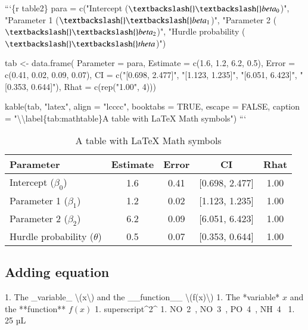 \documentclass[review]{elsarticle} %
\newenvironment{Shaded}{\begin{snugshade}}{\end{snugshade}}
\newcommand{\BaseNTok}[1]{\textcolor[rgb]{0.00,0.00,0.81}{#1}}
\newcommand{\FloatTok}[1]{\textcolor[rgb]{0.00,0.00,0.81}{#1}}
\newcommand{\NormalTok}[1]{#1}
\begin{document}
\begin{Shaded}
\begin{Highlighting}[]
\NormalTok{```\{r table2\}}
\NormalTok{para = c("Intercept ($\textbackslash{}\textbackslash{}beta_0$)",}
\BaseNTok{         "Parameter 1 ($\textbackslash{}\textbackslash{}beta_1$)",}
\BaseNTok{         "Parameter 2 ($\textbackslash{}\textbackslash{}beta_2$)",}
\BaseNTok{         "Hurdle probability ($\textbackslash{}\textbackslash{}theta$)")}

\NormalTok{tab <- data.frame(}
\BaseNTok{    Parameter = para,}
\BaseNTok{    Estimate = c(1.6, 1.2, 6.2, 0.5),}
\BaseNTok{    Error = c(0.41, 0.02, 0.09, 0.07),}
\BaseNTok{    CI = c("[0.698, 2.477]",}
\BaseNTok{           "[1.123, 1.235]",}
\BaseNTok{           "[6.051, 6.423]",}
\BaseNTok{           "[0.353, 0.644]"),}
\BaseNTok{    Rhat = c(rep("1.00", 4)))}

\NormalTok{kable(tab,}
\BaseNTok{      "latex",}
\BaseNTok{      align = "lcccc",}
\BaseNTok{      booktabs = TRUE,}
\BaseNTok{      escape = FALSE,}
\BaseNTok{      caption = "\textbackslash{}\textbackslash{}label\{tab:mathtable\}A table with LaTeX Math symbols")}
\NormalTok{```}
\end{Highlighting}
\end{Shaded}

\begin{table}

\caption{\label{tab:unnamed-chunk-3}\label{tab:mathtable}A table with LaTeX Math symbols}
\centering
\begin{tabular}[t]{lcccc}
\toprule
Parameter & Estimate & Error & CI & Rhat\\
\midrule
Intercept ($\beta_0$) & 1.6 & 0.41 & {}[0.698, 2.477] & 1.00\\
Parameter 1 ($\beta_1$) & 1.2 & 0.02 & {}[1.123, 1.235] & 1.00\\
Parameter 2 ($\beta_2$) & 6.2 & 0.09 & {}[6.051, 6.423] & 1.00\\
Hurdle probability ($\theta$) & 0.5 & 0.07 & {}[0.353, 0.644] & 1.00\\
\bottomrule
\end{tabular}
\end{table}

\subsection{Adding equation}\label{equation}

\begin{Shaded}
\begin{Highlighting}[]
\NormalTok{1. }\FloatTok{The _variable_ \textbackslash{}(x\textbackslash{}) and the __function__ \textbackslash{}(f(x)\textbackslash{})}
\FloatTok{1. The *variable* $x$ and the **function** $f(x)$}
\FloatTok{1. superscript^2^}
\FloatTok{1. NO~2~, NO~3~, PO~4~, NH~4~}
\FloatTok{1. 25 µL}
\end{Highlighting}
\end{Shaded}
\end{document}
